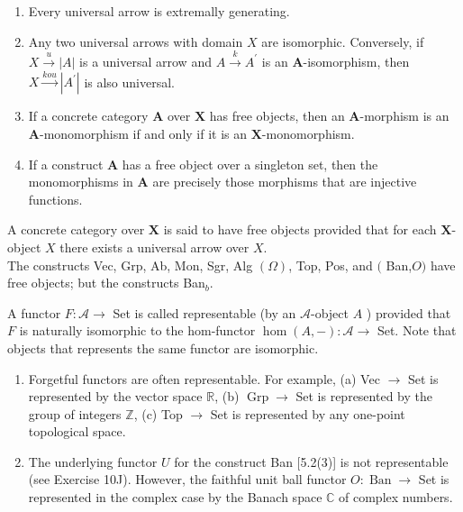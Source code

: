 \begin{example}
\begin{prop}
    \begin{enumerate}
        \item Every universal arrow is extremally generating.
        \item Any two universal arrows with domain $X$ are isomorphic. Conversely, if $X \xrightarrow{u}|A|$ is a universal arrow and $A \xrightarrow{k} A^{\prime}$ is an $\mathbf{A}$-isomorphism, then $X \xrightarrow{k o u}\left|A^{\prime}\right|$ is also universal.
        \item If a concrete category $\mathbf{A}$ over $\mathbf{X}$ has free objects, then an $\mathbf{A}$-morphism is an $\mathbf{A}$-monomorphism if and only if it is an $\mathbf{X}$-monomorphism.
        \item If a construct $\mathbf{A}$ has a free object over a singleton set, then the monomorphisms in $\mathbf{A}$ are precisely those morphisms that are injective functions.
    \end{enumerate}
\end{prop}

A concrete category over $\mathbf{X}$ is said to have free objects provided that for each $\mathbf{X}$-object $X$ there exists a universal arrow over $X$.\\
The constructs Vec, Grp, Ab, Mon, Sgr, Alg $(\Omega)$, Top, Pos, and $($ Ban,$O)$ have free objects; but the constructs Ban$_b$.

A functor $F: \mathcal{A} \rightarrow$ Set is called representable (by an $\mathcal{A}$-object $A$ ) provided that $F$ is naturally isomorphic to the hom-functor $\operatorname{hom}(A,-): \mathcal{A} \rightarrow$ Set. Note that objects that represents the same functor are isomorphic.

\begin{example}
    \begin{enumerate}
        \item Forgetful functors are often representable. For example,
        (a) Vec $\rightarrow$ Set is represented by the vector space $\mathbb{R}$,
        (b) $\operatorname{Grp} \rightarrow$ Set is represented by the group of integers $\mathbb{Z}$,
        (c) Top $\rightarrow$ Set is represented by any one-point topological space.
        \item The underlying functor $U$ for the construct Ban [5.2(3)] is not representable (see Exercise 10J). However, the faithful unit ball functor $O: \operatorname{Ban} \rightarrow$ Set is represented in the complex case by the Banach space $\mathbb{C}$ of complex numbers.
    \end{enumerate}
\end{example}


\end{example}

